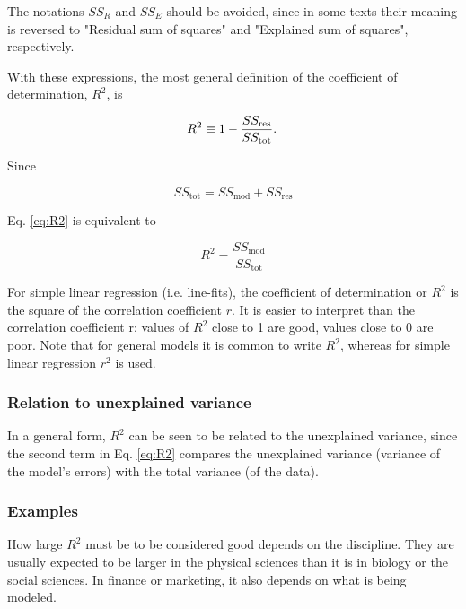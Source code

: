 The notations $SS_{R}$ and $SS_{E}$ should be avoided, since in some texts their meaning is reversed to "Residual sum of squares" and "Explained sum of squares", respectively.

With these expressions, the most general definition of the coefficient of determination, $R^2$, is

\begin{equation}\label{eq:R2}
  R^2 \equiv 1 - {SS_{\rm res}\over SS_{\rm tot}}.\,
\end{equation}

Since

\begin{equation}
  SS_\text{tot} = SS_\text{mod} + SS_\text{res}
\end{equation}

Eq. \ref{eq:R2} is equivalent to

\begin{equation}
  R^2 = \frac{SS_\text{mod}}{SS_\text{tot}}
\end{equation}

For simple linear regression (i.e. line-fits), the coefficient of determination or $R^2$ is the square of the correlation coefficient $r$. It is easier to interpret than the correlation coefficient r: values of $R^2$ close to 1 are good, values close to 0 are poor.
Note that for general models it is common to write $R^2$, whereas for simple linear regression $r^2$ is used.

\subsubsection{Relation to unexplained variance}

In a general form, $R^2$ can be seen to be related to the unexplained variance, since the second term in Eq. \ref{eq:R2} compares the unexplained variance (variance of the model's errors) with the total variance (of the data).

\subsubsection{Examples}

How large $R^2$ must be to be considered good depends on the discipline. They are usually expected to be larger in the physical sciences than it is in biology or the social sciences. In finance or marketing, it also depends on what is being modeled.

